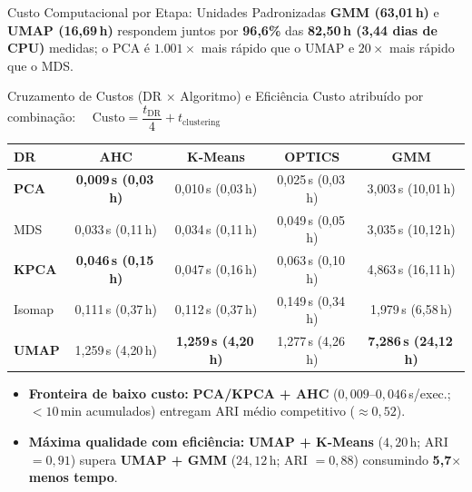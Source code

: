 \documentclass[aspectratio=169,11pt]{beamer}
\begin{document}
\begin{frame}{Custo Computacional por Etapa: Unidades Padronizadas}
  \vspace{-0.4em}
  \footnotesize
  \textbf{GMM (63{,}01\,h)} e \textbf{UMAP (16{,}69\,h)} respondem juntos por \textbf{96{,}6\%} das \textbf{82{,}50\,h (3{,}44 dias de CPU)} medidas; o PCA é $1{.}001\times$ mais rápido que o UMAP e $20\times$ mais rápido que o MDS.
\end{frame}

\begin{frame}{Cruzamento de Custos (DR $\times$ Algoritmo) e Eficiência}
  \centering\footnotesize
  Custo atribuído por combinação: $\quad \text{Custo} = \dfrac{t_{\text{DR}}}{4} + t_{\text{clustering}}$

  \vspace{0.3em}
  \begin{table}
    \centering
    \footnotesize
    \setlength{\tabcolsep}{5pt}
    \renewcommand{\arraystretch}{1.15}
    \begin{tabular}{lcccc}
      \toprule
      DR & AHC & K-Means & OPTICS & GMM \\
      \midrule
      \textbf{PCA}    & \textbf{0{,}009\,s (0{,}03\,h)} & 0{,}010\,s (0{,}03\,h) & 0{,}025\,s (0{,}03\,h) & 3{,}003\,s (10{,}01\,h) \\
      MDS             & 0{,}033\,s (0{,}11\,h)          & 0{,}034\,s (0{,}11\,h) & 0{,}049\,s (0{,}05\,h) & 3{,}035\,s (10{,}12\,h) \\
      \textbf{KPCA}   & \textbf{0{,}046\,s (0{,}15\,h)} & 0{,}047\,s (0{,}16\,h) & 0{,}063\,s (0{,}10\,h) & 4{,}863\,s (16{,}11\,h) \\
      Isomap          & 0{,}111\,s (0{,}37\,h)          & 0{,}112\,s (0{,}37\,h) & 0{,}149\,s (0{,}34\,h) & 1{,}979\,s (6{,}58\,h)  \\
      \textbf{UMAP}   & 1{,}259\,s (4{,}20\,h)          & \textbf{1{,}259\,s (4{,}20\,h)} & 1{,}277\,s (4{,}26\,h) & \textbf{7{,}286\,s (24{,}12\,h)} \\
      \bottomrule
    \end{tabular}
  \end{table}

  \vspace{-0.1em}
  \footnotesize
  \begin{itemize}
    \setlength{\itemsep}{2pt}
    \item \textbf{Fronteira de baixo custo:} \textbf{PCA/KPCA + AHC} ($0{,}009$--$0{,}046$\,s/exec.; $< 10$\,min acumulados) entregam ARI médio competitivo ($\approx 0{,}52$).
    \item \textbf{Máxima qualidade com eficiência:} \textbf{UMAP + K-Means} ($4{,}20$\,h; ARI $= 0{,}91$) supera \textbf{UMAP + GMM} ($24{,}12$\,h; ARI $= 0{,}88$) consumindo \textbf{5{,}7$\times$ menos tempo}.
  \end{itemize}
\end{frame}
\end{document}
